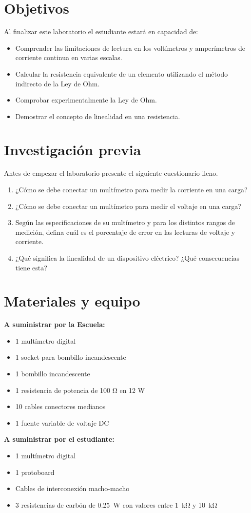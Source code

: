 \documentclass[12pt,letterpaper]{report}
\newcommand{\obj}{Objetivos}
\newcommand{\inv}{Investigación previa}
\newcommand{\mat}{Materiales y equipo}
\newcommand{\capacidad}{Al finalizar este laboratorio el estudiante estará en capacidad de:}
\newcommand{\antesde}{Antes de empezar el laboratorio presente el siguiente cuestionario lleno.}
\begin{document}
\section{\obj}
\capacidad
\begin{itemize}
\item Comprender las limitaciones de lectura en los voltímetros y amperímetros de corriente continua en varias escalas.
\item Calcular la resistencia equivalente de un elemento utilizando el método indirecto de la Ley de Ohm.
\item	Comprobar experimentalmente la Ley de Ohm.
\item	Demostrar el concepto de linealidad en una resistencia.
\end{itemize}

\section{\inv}
\antesde
\begin{enumerate}
\item	¿Cómo se debe conectar un multímetro para medir la corriente en una carga? 
\item	¿Cómo se debe conectar un multímetro para medir el voltaje en una carga?
\item	Según las especificaciones de su multímetro y para los distintos rangos de medición, defina cuál es el porcentaje de error en las lecturas de voltaje y corriente.
\item	¿Qué significa la linealidad de un dispositivo eléctrico? ¿Qué consecuencias tiene esta?
\end{enumerate}

\section{\mat}
\textbf{A suministrar por la Escuela:}
\begin{itemize}
\item 1 multímetro digital
\item 1 socket para bombillo incandescente
\item 1 bombillo incandescente
\item 1 resistencia de potencia de 100 \si{\ohm} en 12 \si{\watt}
\item 10 cables conectores medianos
\item 1 fuente variable de voltaje DC
\end{itemize}
\textbf{A suministrar por el estudiante:}
\begin{itemize}
\item 1 multímetro digital
\item 1 protoboard
\item Cables de interconexión macho-macho
\item 3 resistencias de carbón de \SI{0,25}{\watt} con valores entre \SI{1}{\kilo\ohm} y \SI{10}{\kilo\ohm}
\end{itemize}
\end{document}
